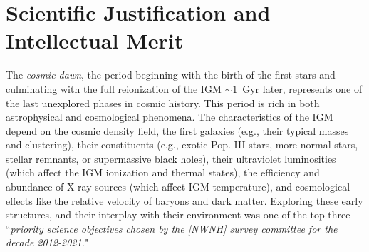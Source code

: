 \documentclass[preprint]{aastex}
\newcommand{\compress}{\vspace{-0.3in}}
\begin{document}




\compress
\section{Scientific Justification and Intellectual Merit} %



The {\it cosmic dawn}, the period beginning with the birth of the first stars and culminating with the full
reionization of the IGM 
$\sim 1$~Gyr later, represents one of the last unexplored phases in cosmic history. 
This period is rich in both astrophysical and cosmological phenomena. 
The characteristics of the IGM depend on the cosmic density field, the first galaxies (e.g., their typical masses and 
clustering), their constituents (e.g., exotic Pop. III 
stars, more normal stars, stellar remnants, or supermassive black holes), their ultraviolet luminosities (which affect
the IGM ionization and thermal states), the efficiency and abundance of X-ray sources (which affect IGM temperature), 
and cosmological effects like the relative velocity of baryons and dark matter. 
Exploring these early structures, and their interplay with their environment was one of the top three ``{\it priority science objectives chosen by 
the [NWNH] survey committee for the decade 2012-2021.}"

\end{document}
